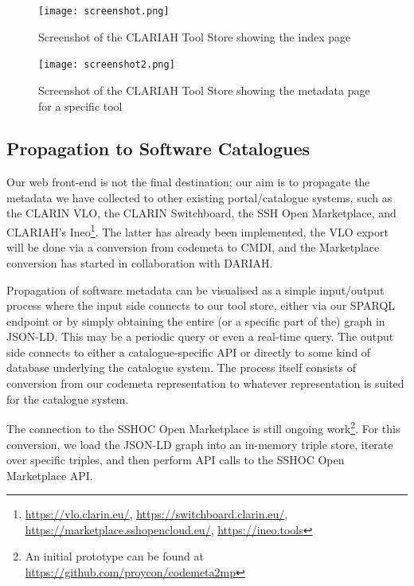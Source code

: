 \documentclass[a4paper,11pt]{article}
\begin{document}
\begin{figure}[h]
\begin{center}
\texttt{[image: screenshot.png]}
\caption{Screenshot of the CLARIAH Tool Store showing the index page}
\label{fig:toolstore1}
\end{center}
\end{figure}

\begin{figure}[h!]
\begin{center}
\texttt{[image: screenshot2.png]}
\caption{Screenshot of the CLARIAH Tool Store showing the metadata page for a specific tool}
\label{fig:toolstore2}
\end{center}
\end{figure}

\subsection{Propagation to Software Catalogues}

Our web front-end is not the final destination; our aim is to propagate the
metadata we have collected to other existing portal/catalogue systems, such as
the CLARIN VLO, the CLARIN Switchboard, the SSH Open Marketplace, and CLARIAH's
Ineo\footnote{\url{https://vlo.clarin.eu/},
\url{https://switchboard.clarin.eu/},
\url{https://marketplace.sshopencloud.eu/}, \url{https://ineo.tools}}. The
latter has already been implemented, the VLO export will be done via a conversion
from codemeta to CMDI, and the Marketplace conversion has started in collaboration with
DARIAH.

Propagation of software metadata can be visualised as a simple input/output
process where the input side connects to our tool store, either via our SPARQL
endpoint or by simply obtaining the entire (or a specific part of the) graph in
JSON-LD. This may be a periodic query or even a real-time query. The output
side connects to either a catalogue-specific API or directly to some kind of
database underlying the catalogue system. The process itself consists of
conversion from our codemeta representation to whatever representation is
suited for the catalogue system.

The connection to the SSHOC Open Marketplace is still ongoing work\footnote{An
initial prototype can be found at
\url{https://github.com/proycon/codemeta2mp}}. For this conversion, we load the
JSON-LD graph into an in-memory triple store, iterate over specific triples, and
then perform API calls to the SSHOC Open Marketplace API.
\end{document}
